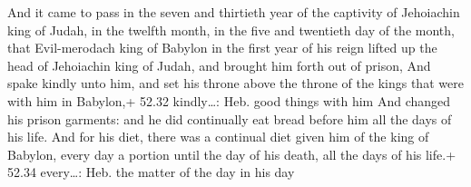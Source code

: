  And it came to pass in the seven and thirtieth year of
the captivity of Jehoiachin king of Judah, in the twelfth month, in the
five and twentieth day of the month, that Evil-merodach king of Babylon
in the first year of his reign lifted up the head of Jehoiachin king of
Judah, and brought him forth out of prison,  And spake
kindly unto him, and set his throne above the throne of the kings that
were with him in Babylon,+ 52.32 kindly\ldots: Heb. good things with him
 And changed his prison garments: and he did continually
eat bread before him all the days of his life.  And for
his diet, there was a continual diet given him of the king of Babylon,
every day a portion until the day of his death, all the days of his
life.+ 52.34 every\ldots: Heb. the matter of the day in his day
